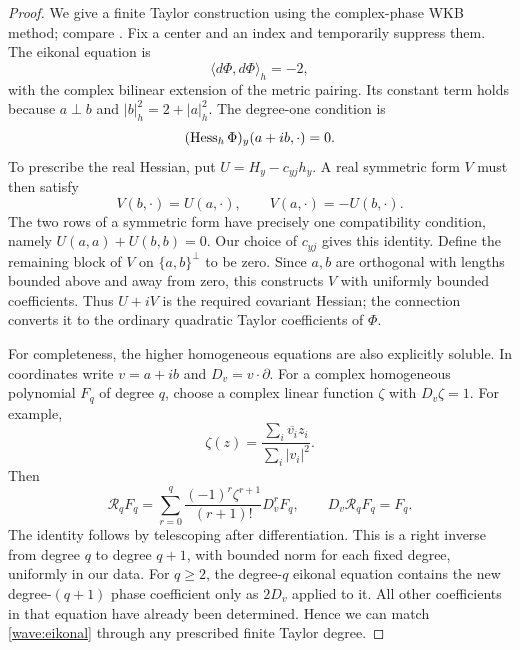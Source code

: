 \begin{proof}
We give a finite Taylor construction using the complex-phase WKB method;
compare \cite[Section~3]{DenckerSjostrandZworski2004}.
Fix a center and an index and
temporarily suppress them. The eikonal equation is
\begin{equation}
 \langle d\Phi,d\Phi\rangle_h=-2,
 \label{wave:eikonal}
\end{equation}
with the complex bilinear extension of the metric pairing. Its constant
term holds because $a\perp b$ and $|b|_h^2=2+|a|_h^2$. The degree-one
condition is
\[
 (\operatorname{Hess}_h\Phi)_y(a+i b,\cdot)=0.
\]
To prescribe the real Hessian, put $U=H_y-c_{yj}h_y$. A real symmetric
form $V$ must then satisfy
\begin{equation}
 V(b,\cdot)=U(a,\cdot),\qquad
 V(a,\cdot)=-U(b,\cdot).
 \label{wave:hessian-compatibility}
\end{equation}
The two rows of a symmetric form have precisely one compatibility
condition, namely $U(a,a)+U(b,b)=0$. Our choice of $c_{yj}$ gives this
identity. Define the remaining block of $V$ on $\{a,b\}^\perp$ to be
zero. Since $a,b$ are orthogonal with lengths bounded above and away
from zero, this constructs $V$ with uniformly bounded coefficients.
Thus $U+iV$ is the required covariant Hessian; the connection converts
it to the ordinary quadratic Taylor coefficients of $\Phi$.

For completeness, the higher homogeneous equations are also explicitly
soluble. In coordinates write $v=a+i b$ and $D_v=v\cdot\partial$.
For a complex homogeneous polynomial $F_q$ of degree $q$, choose a
complex linear function $\zeta$ with $D_v\zeta=1$. For example,
\[
 \zeta(z)=\frac{\sum_i\overline{v_i}z_i}{\sum_i|v_i|^2}.
\]
Then
\begin{equation}
 \mathcal R_qF_q
 =\sum_{r=0}^q\frac{(-1)^r\zeta^{r+1}}{(r+1)!}D_v^rF_q,
 \qquad D_v\mathcal R_qF_q=F_q.
 \label{wave:jet-inverse}
\end{equation}
The identity follows by telescoping after differentiation.
This is a right inverse from degree $q$ to degree $q+1$, with bounded
norm for each fixed degree, uniformly in our data. For $q\ge2$, the
degree-$q$ eikonal equation contains the new degree-$(q+1)$ phase
coefficient only as $2D_v$ applied to it. All other coefficients in
that equation have already been determined. Hence we can match
\eqref{wave:eikonal} through any prescribed finite Taylor degree.


\end{proof}
